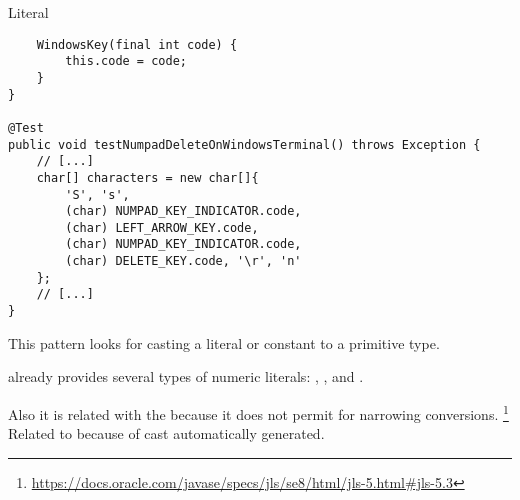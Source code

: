 \begin{pattern}{Literal}
\begin{verbatim}
    WindowsKey(final int code) {
        this.code = code;
    }
}

@Test
public void testNumpadDeleteOnWindowsTerminal() throws Exception {
    // [...]
    char[] characters = new char[]{
        'S', 's',
        (char) NUMPAD_KEY_INDICATOR.code,
        (char) LEFT_ARROW_KEY.code,
        (char) NUMPAD_KEY_INDICATOR.code,
        (char) DELETE_KEY.code, '\r', 'n'
    };
    // [...]
}
\end{verbatim}

\detection{}
This pattern looks for casting a literal or constant to a primitive type.

\discussion{}
\java{} already provides several types of numeric literals:
, ,  and .

\related{}
%
%
Also it is related with the 
because it does not permit for narrowing conversions.%
\footnote{\url{https://docs.oracle.com/javase/specs/jls/se8/html/jls-5.html\#jls-5.3}}
%
%
Related to  because of cast automatically generated.
\end{pattern}